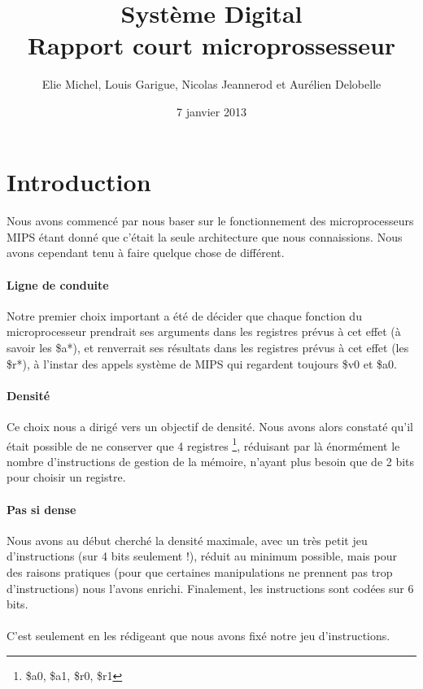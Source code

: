 \documentclass{article}
\title{Système Digital\\Rapport court microprossesseur}
\author{Elie Michel, Louis Garigue, Nicolas Jeannerod et Aurélien Delobelle}
\date{7 janvier 2013}
\begin{document}
\maketitle

\section{Introduction}

\paragraph{}
Nous avons commencé par nous baser sur le fonctionnement des microprocesseurs
MIPS étant donné que c'était la seule architecture que nous connaissions.
Nous avons cependant tenu à faire quelque chose de différent.

\paragraph{Ligne de conduite}
Notre premier choix important a été de décider que chaque fonction du
microprocesseur prendrait ses arguments dans les registres prévus à cet effet
(à savoir les \$a*), et renverrait ses résultats dans les registres prévus à
cet effet (les \$r*), à l'instar des appels système de MIPS qui regardent
toujours \$v0 et \$a0.

\paragraph{Densité}
Ce choix nous a dirigé vers un objectif de densité. Nous avons alors constaté
qu'il était possible de ne conserver que 4 registres
\footnote{\$a0, \$a1, \$r0, \$r1}, réduisant par là énormément le nombre
d'instructions de gestion de la mémoire, n'ayant plus besoin que de 2 bits
pour choisir un registre.

\paragraph{Pas si dense}
Nous avons au début cherché la densité maximale, avec un très petit jeu
d'instructions (sur 4 bits seulement !), réduit au minimum possible, mais
pour des raisons pratiques (pour que certaines manipulations ne prennent pas
trop d'instructions) nous l'avons enrichi. Finalement, les instructions sont
codées sur 6 bits.

\paragraph{}
C'est seulement en les rédigeant que nous avons fixé notre jeu d'instructions.
\end{document}

